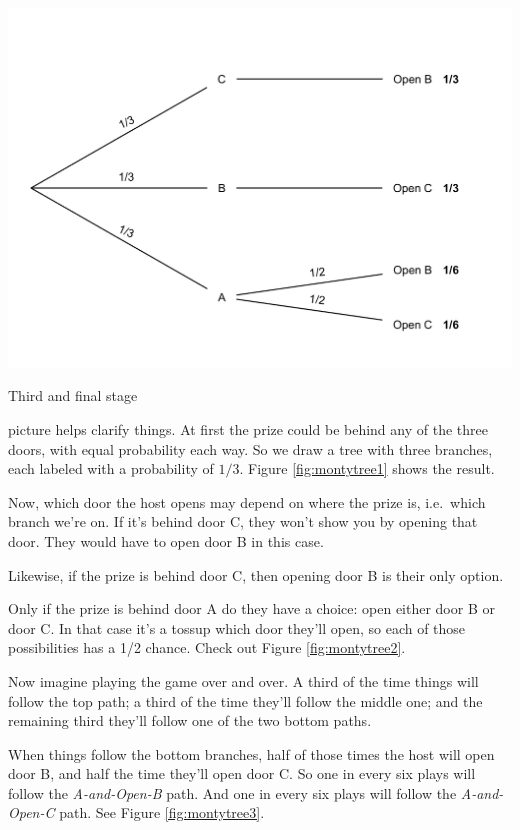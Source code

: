 \documentclass[justified]{tufte-book}
\theoremstyle{definition}
\theoremstyle{definition}
\theoremstyle{definition}
\theoremstyle{remark}
\begin{document}
\begin{marginfigure}
\includegraphics{_main_files/figure-latex/montytree3-1} \caption[Third and final stage]{Third and final stage}\label{fig:montytree3}
\end{marginfigure}

 picture helps clarify things. At first the prize could be
behind any of the three doors, with equal probability each way. So we
draw a tree with three branches, each labeled with a probability of
\(1/3\). Figure \ref{fig:montytree1} shows the result.

Now, which door the host opens may depend on where the prize is,
i.e.~which branch we're on. If it's behind door C, they won't show you
by opening that door. They would have to open door B in this case.

Likewise, if the prize is behind door C, then opening door B is their
only option.

Only if the prize is behind door A do they have a choice: open either
door B or door C. In that case it's a tossup which door they'll open, so
each of those possibilities has a 1/2 chance. Check out Figure
\ref{fig:montytree2}.

Now imagine playing the game over and over. A third of the time things
will follow the top path; a third of the time they'll follow the middle
one; and the remaining third they'll follow one of the two bottom paths.

When things follow the bottom branches, half of those times the host
will open door B, and half the time they'll open door C. So one in every
six plays will follow the \emph{A-and-Open-B} path. And one in every six
plays will follow the \emph{A-and-Open-C} path. See Figure
\ref{fig:montytree3}.
\end{document}
